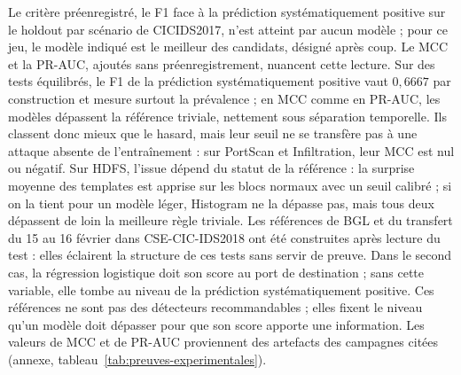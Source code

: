 Le critère préenregistré, le F1 face à la prédiction systématiquement positive sur le holdout par scénario de CICIDS2017, n'est atteint par aucun modèle ; pour ce jeu, le modèle indiqué est le meilleur des candidats, désigné après coup. Le MCC et la PR-AUC, ajoutés sans préenregistrement, nuancent cette lecture. Sur des tests équilibrés, le F1 de la prédiction systématiquement positive vaut $0{,}6667$ par construction et mesure surtout la prévalence ; en MCC comme en PR-AUC, les modèles dépassent la référence triviale, nettement sous séparation temporelle. Ils classent donc mieux que le hasard, mais leur seuil ne se transfère pas à une attaque absente de l'entraînement : sur PortScan et Infiltration, leur MCC est nul ou négatif. Sur HDFS, l'issue dépend du statut de la référence : la surprise moyenne des templates est apprise sur les blocs normaux avec un seuil calibré ; si on la tient pour un modèle léger, Histogram ne la dépasse pas, mais tous deux dépassent de loin la meilleure règle triviale. Les références de BGL et du transfert du 15 au 16 février dans CSE-CIC-IDS2018 ont été construites après lecture du test : elles éclairent la structure de ces tests sans servir de preuve. Dans le second cas, la régression logistique doit son score au port de destination ; sans cette variable, elle tombe au niveau de la prédiction systématiquement positive. Ces références ne sont pas des détecteurs recommandables ; elles fixent le niveau qu'un modèle doit dépasser pour que son score apporte une information. Les valeurs de MCC et de PR-AUC proviennent des artefacts des campagnes citées (annexe, tableau~\ref{tab:preuves-experimentales}).
